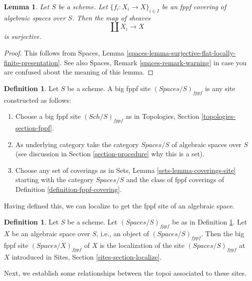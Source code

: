 \documentclass{stacks-project}
\theoremstyle{plain}
\newtheorem{lemma}[subsection]{Lemma}
\theoremstyle{definition}
\newtheorem{definition}[subsection]{Definition}
\theoremstyle{remark}
\numberwithin{equation}{subsection}
\def\Sch{\mathit{Sch}}
\begin{document}
\begin{lemma}
\label{lemma-fppf-covering-surjective}
Let $S$ be a scheme.
Let $\{f_i : X_i \to X\}_{i \in I}$ be an fppf covering of algebraic
spaces over $S$. Then the map of sheaves
$$
\coprod X_i \longrightarrow X
$$
is surjective.
\end{lemma}

\begin{proof}
This follows from
Spaces, Lemma \ref{spaces-lemma-surjective-flat-locally-finite-presentation}.
See also
Spaces, Remark \ref{spaces-remark-warning}
in case you are confused about the meaning of this lemma.
\end{proof}

\begin{definition}
\label{definition-big-fppf-site}
Let $S$ be a scheme. A big fppf site {\it $(\textit{Spaces}/S)_{fppf}$}
is any site constructed as follows:
\begin{enumerate}
\item Choose a big fppf site $(\Sch/S)_{fppf}$ as in
Topologies, Section \ref{topologies-section-fppf}.
\item As underlying category take the category $\textit{Spaces}/S$
of algebraic spaces over $S$ (see discussion in
Section \ref{section-procedure} why this is a set).
\item Choose any set of coverings as in
Sets, Lemma \ref{sets-lemma-coverings-site} starting with the
category $\textit{Spaces}/S$ and the class of fppf coverings
of Definition \ref{definition-fppf-covering}.
\end{enumerate}
\end{definition}

\noindent
Having defined this, we can localize to get the fppf
site of an algebraic space.

\begin{definition}
\label{definition-big-small-fppf}
Let $S$ be a scheme. Let $(\textit{Spaces}/S)_{fppf}$ be as in
Definition \ref{definition-big-fppf-site}.
Let $X$ be an algebraic space over $S$, i.e., an object of
$(\textit{Spaces}/S)_{fppf}$. Then the big fppf site
{\it $(\textit{Spaces}/X)_{fppf}$} of $X$
is the localization of the site $(\textit{Spaces}/S)_{fppf}$
at $X$ introduced in Sites, Section \ref{sites-section-localize}.
\end{definition}

\noindent
Next, we establish some relationships between the topoi
associated to these sites.
\end{document}
